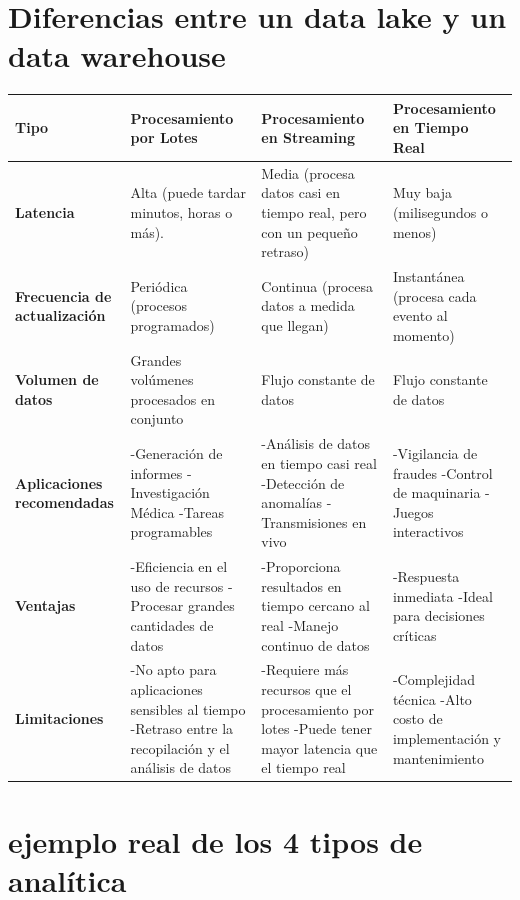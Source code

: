 \documentclass[12pt]{article}
\begin{document}
\clearpage
\section{Diferencias entre un data lake y un data warehouse}

\renewcommand{\arraystretch}{2} %

\begin{tabularx}{\textwidth}{|>{\raggedright\arraybackslash}X|>{\raggedright\arraybackslash}X|>{\raggedright\arraybackslash}X|>{\raggedright\arraybackslash}X|}
    \hline
    \textbf{Tipo} & \textbf{Procesamiento por Lotes} & \textbf{Procesamiento en Streaming} & \textbf{Procesamiento en Tiempo Real} \\
    \hline
    \textbf{Latencia} & Alta (puede tardar minutos, horas o más). & Media (procesa datos casi en tiempo real, pero con un pequeño retraso) & Muy baja (milisegundos o menos) \\
    \hline
    \textbf{Frecuencia de actualización} & Periódica (procesos programados) & Continua (procesa datos a medida que llegan) & Instantánea (procesa cada evento al momento)\\
    \hline
    \textbf{Volumen de datos} & Grandes volúmenes procesados en conjunto & Flujo constante de datos & Flujo constante de datos \\
    \hline
    \textbf{Aplicaciones recomendadas} & -Generación de informes -Investigación Médica  -Tareas programables & -Análisis de datos en tiempo casi real -Detección de anomalías -Transmisiones en vivo & -Vigilancia de fraudes -Control de maquinaria -Juegos interactivos \\
    \hline
    \textbf{Ventajas} & -Eficiencia en el uso de recursos -Procesar grandes cantidades de datos & -Proporciona resultados en tiempo cercano al real -Manejo continuo de datos & -Respuesta inmediata -Ideal para decisiones críticas \\
    \hline
    \textbf{Limitaciones} & -No apto para aplicaciones sensibles al tiempo -Retraso entre la recopilación y el análisis de datos &  -Requiere más recursos que el procesamiento por lotes -Puede tener mayor latencia que el tiempo real & -Complejidad técnica -Alto costo de implementación y mantenimiento \\
    \hline
\end{tabularx}

\clearpage

\section{ejemplo real de los 4 tipos de analítica}
\end{document}
